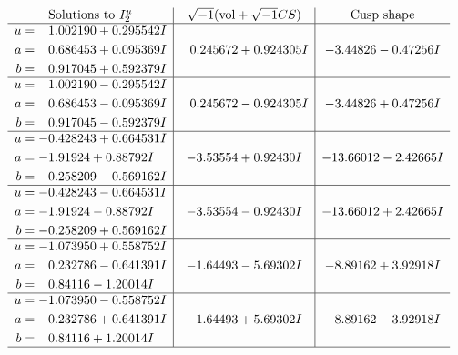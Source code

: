 \documentclass[1p]{elsarticle_modified}
\theoremstyle{definition}
\newcommand{\I}{\sqrt{-1}}
\begin{document}
$$\begin{array}{c|c|c}  
\text{Solutions to }I^u_{2}& \I (\text{vol} + \sqrt{-1}CS) & \text{Cusp shape}\\
 \hline 
\begin{aligned}
u &= \phantom{-}1.002190 + 0.295542 I \\
a &= \phantom{-}0.686453 + 0.095369 I \\
b &= \phantom{-}0.917045 + 0.592379 I\end{aligned}
 & \phantom{-}0.245672 + 0.924305 I & -3.44826 - 0.47256 I \\ \hline\begin{aligned}
u &= \phantom{-}1.002190 - 0.295542 I \\
a &= \phantom{-}0.686453 - 0.095369 I \\
b &= \phantom{-}0.917045 - 0.592379 I\end{aligned}
 & \phantom{-}0.245672 - 0.924305 I & -3.44826 + 0.47256 I \\ \hline\begin{aligned}
u &= -0.428243 + 0.664531 I \\
a &= -1.91924 + 0.88792 I \\
b &= -0.258209 - 0.569162 I\end{aligned}
 & -3.53554 + 0.92430 I & -13.66012 - 2.42665 I \\ \hline\begin{aligned}
u &= -0.428243 - 0.664531 I \\
a &= -1.91924 - 0.88792 I \\
b &= -0.258209 + 0.569162 I\end{aligned}
 & -3.53554 - 0.92430 I & -13.66012 + 2.42665 I \\ \hline\begin{aligned}
u &= -1.073950 + 0.558752 I \\
a &= \phantom{-}0.232786 - 0.641391 I \\
b &= \phantom{-}0.84116 - 1.20014 I\end{aligned}
 & -1.64493 - 5.69302 I & -8.89162 + 3.92918 I \\ \hline\begin{aligned}
u &= -1.073950 - 0.558752 I \\
a &= \phantom{-}0.232786 + 0.641391 I \\
b &= \phantom{-}0.84116 + 1.20014 I\end{aligned}
 & -1.64493 + 5.69302 I & -8.89162 - 3.92918 I\\
 \hline 
 \end{array}$$\newpage\newpage\renewcommand{\arraystretch}{1}
\end{document}
